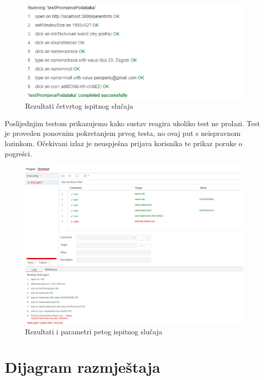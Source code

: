 		\begin{figure}[H]
			\includegraphics[width=\textwidth]{slike/promjenaPodataka.PNG} %
			\caption{Rezultati četvrtog ispitnog slučaja}
			\label{fig:promjenaPodatakaTest} %
		\end{figure}
		\eject
		
		Poslijednjim testom prikazujemo kako sustav reagira ukoliko test ne prolazi. Test je proveden ponovnim pokretanjem prvog testa, no ovaj put s neispravnom lozinkom. Očekivani izlaz je neuspješna prijava korisnika te prikaz poruke o pogrešci.
		
		\begin{figure}[H]
			\includegraphics[width=\textwidth]{slike/neispravnaPrijava.PNG} %
			\caption{Rezultati i parametri petog ispitnog slučaja}
			\label{fig:neispravnaPrijavaTest} %
		\end{figure}
		\eject
		
		\section{Dijagram razmještaja}
			
